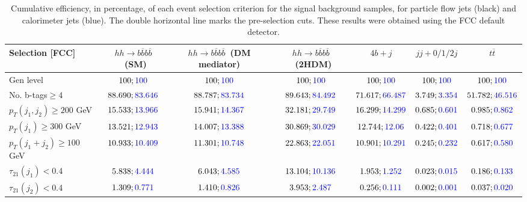 \begin{landscape}
		\begin{table}
			\centering
			\caption{Cumulative efficiency, in percentage, of each event selection criterion for the signal background samples, for particle flow jets (black) and calorimeter jets (blue). The double horizontal line marks the pre-selection cuts. These results were obtained using the FCC default detector.}
			\begin{tabular}{lcccccc}
				\toprule 
				\textbf{Selection [FCC]} & $hh\rightarrow b\overline{b}b\overline{b}$~(SM) & $hh\rightarrow b\overline{b}b\overline{b}$~(DM mediator) & $hh\rightarrow b\overline{b}b\overline{b}$~(2HDM) & $4b+j$  & $jj+0/1/2 j$ & $t\overline{t}$ \\
				\midrule
				Gen level & $100;\textcolor{blue}{100}$ & $100;\textcolor{blue}{100}$ &$100;\textcolor{blue}{100}$& $100;\textcolor{blue}{100}$& $100;\textcolor{blue}{100}$& $100;\textcolor{blue}{100}$ \\
				\rowcolor{black!7}No. b-tags$\geq 4$&$88.690;\textcolor{blue}{83.646}$&$88.787;\textcolor{blue}{83.734}$&$89.643;\textcolor{blue}{84.492}$&$71.617;\textcolor{blue}{66.487}$&$3.749;\textcolor{blue}{3.354}$&$51.782;\textcolor{blue}{46.516}$\\
				$p_T(j_1,j_2)\geq200$ GeV & $15.533;\textcolor{blue}{13.966}$ & $15.941;\textcolor{blue}{14.367}$&$32.181;\textcolor{blue}{29.749}$ &$16.299;\textcolor{blue}{14.299}$&$0.685;\textcolor{blue}{0.601}$&$0.985;\textcolor{blue}{0.862}$\\ 
				\midrule \midrule
				\rowcolor{black!7}$p_T(j_1)\geq 300$ GeV & $13.521;\textcolor{blue}{12.943}$ &$14.007;\textcolor{blue}{13.388}$  &$30.869;\textcolor{blue}{30.029}$&$12.744;\textcolor{blue}{12.06}$&$0.422;\textcolor{blue}{0.401}$&$0.718;\textcolor{blue}{0.677}$\\ 
				$p_T(j_1+j_2)\geq 100$ GeV &$10.933;\textcolor{blue}{10.409}$ & $11.301;\textcolor{blue}{10.748}$ &$22.863;\textcolor{blue}{22.051}$&$10.901;\textcolor{blue}{10.291}$&$0.245;\textcolor{blue}{0.232}$&$0.617;\textcolor{blue}{0.580}$\\
				\rowcolor{black!7}$\tau_{21}(j_1)<0.4$ & $5.838;\textcolor{blue}{4.444}$& $6.043;\textcolor{blue}{4.585}$&$13.104;\textcolor{blue}{10.136}$&$1.953;\textcolor{blue}{1.252}$&$0.023;\textcolor{blue}{0.015}$&$0.186;\textcolor{blue}{0.133}$\\
				$\tau_{21}(j_2)<0.4$ &$1.309;\textcolor{blue}{0.771}$ &$1.410;\textcolor{blue}{0.826}$ &$3.953;\textcolor{blue}{2.487}$&$0.256;\textcolor{blue}{0.111}$&$0.002;\textcolor{blue}{0.001}$&$0.037;\textcolor{blue}{0.020}$\\

\end{tabular}
\end{table}
\end{landscape}
